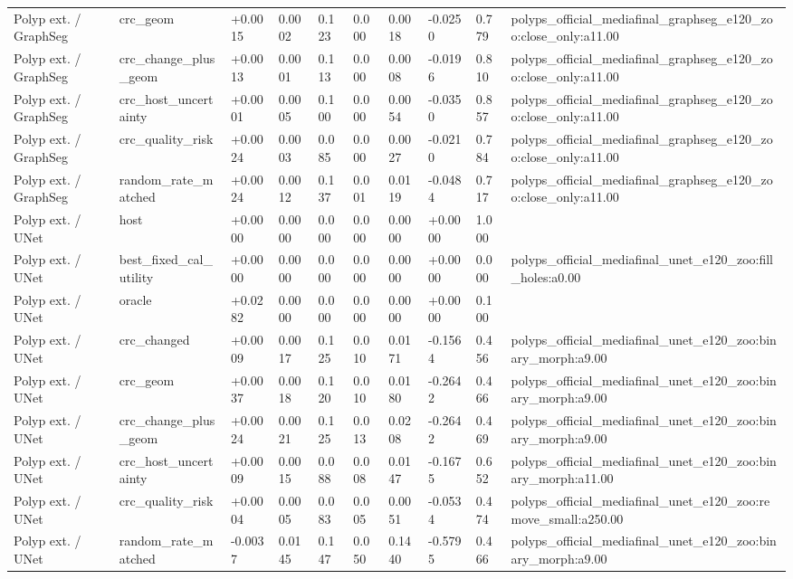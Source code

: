 \begin{table}[t]
\begin{tabular}{llllllllll}
Polyp ext. / GraphSeg & crc\_geom & +0.0015 & 0.0002 & 0.123 & 0.000 & 0.0018 & -0.0250 & 0.779 & polyps\_official\_mediafinal\_graphseg\_e120\_zoo:close\_only:a11.00 \\
Polyp ext. / GraphSeg & crc\_change\_plus\_geom & +0.0013 & 0.0001 & 0.113 & 0.000 & 0.0008 & -0.0196 & 0.810 & polyps\_official\_mediafinal\_graphseg\_e120\_zoo:close\_only:a11.00 \\
Polyp ext. / GraphSeg & crc\_host\_uncertainty & +0.0001 & 0.0005 & 0.100 & 0.000 & 0.0054 & -0.0350 & 0.857 & polyps\_official\_mediafinal\_graphseg\_e120\_zoo:close\_only:a11.00 \\
Polyp ext. / GraphSeg & crc\_quality\_risk & +0.0024 & 0.0003 & 0.085 & 0.000 & 0.0027 & -0.0210 & 0.784 & polyps\_official\_mediafinal\_graphseg\_e120\_zoo:close\_only:a11.00 \\
Polyp ext. / GraphSeg & random\_rate\_matched & +0.0024 & 0.0012 & 0.137 & 0.001 & 0.0119 & -0.0484 & 0.717 & polyps\_official\_mediafinal\_graphseg\_e120\_zoo:close\_only:a11.00 \\
Polyp ext. / UNet & host & +0.0000 & 0.0000 & 0.000 & 0.000 & 0.0000 & +0.0000 & 1.000 &  \\
Polyp ext. / UNet & best\_fixed\_cal\_utility & +0.0000 & 0.0000 & 0.000 & 0.000 & 0.0000 & +0.0000 & 0.000 & polyps\_official\_mediafinal\_unet\_e120\_zoo:fill\_holes:a0.00 \\
Polyp ext. / UNet & oracle & +0.0282 & 0.0000 & 0.000 & 0.000 & 0.0000 & +0.0000 & 0.100 &  \\
Polyp ext. / UNet & crc\_changed & +0.0009 & 0.0017 & 0.125 & 0.010 & 0.0171 & -0.1564 & 0.456 & polyps\_official\_mediafinal\_unet\_e120\_zoo:binary\_morph:a9.00 \\
Polyp ext. / UNet & crc\_geom & +0.0037 & 0.0018 & 0.120 & 0.010 & 0.0180 & -0.2642 & 0.466 & polyps\_official\_mediafinal\_unet\_e120\_zoo:binary\_morph:a9.00 \\
Polyp ext. / UNet & crc\_change\_plus\_geom & +0.0024 & 0.0021 & 0.125 & 0.013 & 0.0208 & -0.2642 & 0.469 & polyps\_official\_mediafinal\_unet\_e120\_zoo:binary\_morph:a9.00 \\
Polyp ext. / UNet & crc\_host\_uncertainty & +0.0009 & 0.0015 & 0.088 & 0.008 & 0.0147 & -0.1675 & 0.652 & polyps\_official\_mediafinal\_unet\_e120\_zoo:binary\_morph:a11.00 \\
Polyp ext. / UNet & crc\_quality\_risk & +0.0004 & 0.0005 & 0.083 & 0.005 & 0.0051 & -0.0534 & 0.474 & polyps\_official\_mediafinal\_unet\_e120\_zoo:remove\_small:a250.00 \\
Polyp ext. / UNet & random\_rate\_matched & -0.0037 & 0.0145 & 0.147 & 0.050 & 0.1440 & -0.5795 & 0.466 & polyps\_official\_mediafinal\_unet\_e120\_zoo:binary\_morph:a9.00 \\
\bottomrule
\end{tabular}
\end{table}
